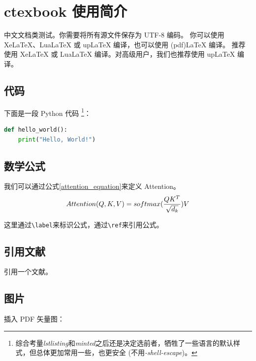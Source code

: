 \chapter{ctexbook 使用简介}
\label{chap:ctexbook}

中文文档类测试。你需要将所有源文件保存为 UTF-8 编码。
你可以使用 XeLaTeX、LuaLaTeX 或 upLaTeX 编译，也可以使用 (pdf)LaTeX 编译。
推荐使用 XeLaTeX 或 LuaLaTeX 编译。对高级用户，我们也推荐使用 upLaTeX 编译。



\section{代码}


下面是一段 Python 代码
\footnote{综合考量\textit{lstlisting}和\textit{minted}之后还是决定选前者，牺牲了一些语言的默认样式，但总体更加常用一些，也更安全 (不用\textit{-shell-escape})。}：
\begin{lstlisting}[language=python, caption={Python 代码示例}]
def hello_world():
    print("Hello, World!")
\end{lstlisting}


\section{数学公式}

我们可以通过公式\ref{attention_equation}来定义 Attention。
\begin{equation}\label{attention_equation}\index{transformer}
    Attention(Q, K, V) = softmax(\frac{QK^T}{\sqrt{d_k}})V
\end{equation}

这里通过\texttt{\textbackslash label}来标识公式，通过\texttt{\textbackslash ref}来引用公式。

\section{引用文献}
引用一个文献\cite{siffer2017anomaly}。


\section{图片}
插入 PDF 矢量图：

